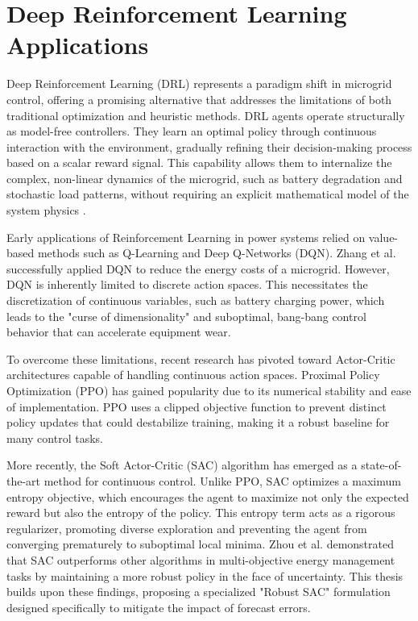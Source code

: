 
\section{Deep Reinforcement Learning Applications}

Deep Reinforcement Learning (DRL) represents a paradigm shift in microgrid control, offering a promising alternative that addresses the limitations of both traditional optimization and heuristic methods. DRL agents operate structurally as model-free controllers. They learn an optimal policy through continuous interaction with the environment, gradually refining their decision-making process based on a scalar reward signal. This capability allows them to internalize the complex, non-linear dynamics of the microgrid, such as battery degradation and stochastic load patterns, without requiring an explicit mathematical model of the system physics \cite{Mocanu2018}.

Early applications of Reinforcement Learning in power systems relied on value-based methods such as Q-Learning and Deep Q-Networks (DQN). Zhang et al. \cite{Zhang2018} successfully applied DQN to reduce the energy costs of a microgrid. However, DQN is inherently limited to discrete action spaces. This necessitates the discretization of continuous variables, such as battery charging power, which leads to the "curse of dimensionality" and suboptimal, bang-bang control behavior that can accelerate equipment wear.

To overcome these limitations, recent research has pivoted toward Actor-Critic architectures capable of handling continuous action spaces. Proximal Policy Optimization (PPO) \cite{Raffin2021} has gained popularity due to its numerical stability and ease of implementation. PPO uses a clipped objective function to prevent distinct policy updates that could destabilize training, making it a robust baseline for many control tasks.

More recently, the Soft Actor-Critic (SAC) algorithm \cite{Haarnoja2018} has emerged as a state-of-the-art method for continuous control. Unlike PPO, SAC optimizes a maximum entropy objective, which encourages the agent to maximize not only the expected reward but also the entropy of the policy. This entropy term acts as a rigorous regularizer, promoting diverse exploration and preventing the agent from converging prematurely to suboptimal local minima. Zhou et al. \cite{Zhou2019} demonstrated that SAC outperforms other algorithms in multi-objective energy management tasks by maintaining a more robust policy in the face of uncertainty. This thesis builds upon these findings, proposing a specialized "Robust SAC" formulation designed specifically to mitigate the impact of forecast errors.
